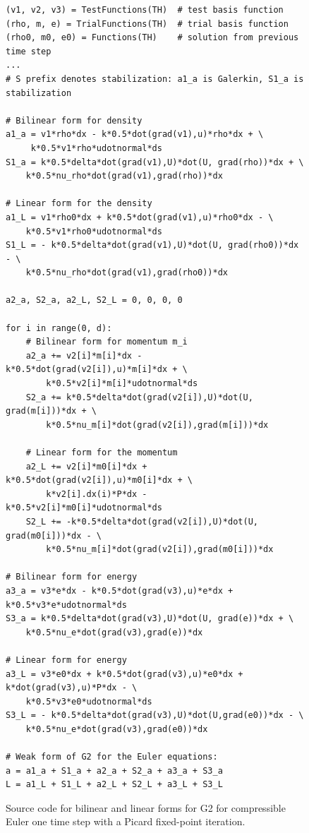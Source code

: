 \begin{figure}[!h]
\begin{lstlisting}
(v1, v2, v3) = TestFunctions(TH)  # test basis function
(rho, m, e) = TrialFunctions(TH)  # trial basis function
(rho0, m0, e0) = Functions(TH)    # solution from previous time step
...
# S prefix denotes stabilization: a1_a is Galerkin, S1_a is stabilization

# Bilinear form for density
a1_a = v1*rho*dx - k*0.5*dot(grad(v1),u)*rho*dx + \
     k*0.5*v1*rho*udotnormal*ds
S1_a = k*0.5*delta*dot(grad(v1),U)*dot(U, grad(rho))*dx + \
    k*0.5*nu_rho*dot(grad(v1),grad(rho))*dx

# Linear form for the density
a1_L = v1*rho0*dx + k*0.5*dot(grad(v1),u)*rho0*dx - \
    k*0.5*v1*rho0*udotnormal*ds
S1_L = - k*0.5*delta*dot(grad(v1),U)*dot(U, grad(rho0))*dx - \
    k*0.5*nu_rho*dot(grad(v1),grad(rho0))*dx

a2_a, S2_a, a2_L, S2_L = 0, 0, 0, 0

for i in range(0, d):
    # Bilinear form for momentum m_i
    a2_a += v2[i]*m[i]*dx - k*0.5*dot(grad(v2[i]),u)*m[i]*dx + \
        k*0.5*v2[i]*m[i]*udotnormal*ds
    S2_a += k*0.5*delta*dot(grad(v2[i]),U)*dot(U, grad(m[i]))*dx + \
        k*0.5*nu_m[i]*dot(grad(v2[i]),grad(m[i]))*dx

    # Linear form for the momentum
    a2_L += v2[i]*m0[i]*dx + k*0.5*dot(grad(v2[i]),u)*m0[i]*dx + \
        k*v2[i].dx(i)*P*dx - k*0.5*v2[i]*m0[i]*udotnormal*ds
    S2_L += -k*0.5*delta*dot(grad(v2[i]),U)*dot(U, grad(m0[i]))*dx - \
        k*0.5*nu_m[i]*dot(grad(v2[i]),grad(m0[i]))*dx

# Bilinear form for energy
a3_a = v3*e*dx - k*0.5*dot(grad(v3),u)*e*dx + k*0.5*v3*e*udotnormal*ds
S3_a = k*0.5*delta*dot(grad(v3),U)*dot(U, grad(e))*dx + \
    k*0.5*nu_e*dot(grad(v3),grad(e))*dx

# Linear form for energy
a3_L = v3*e0*dx + k*0.5*dot(grad(v3),u)*e0*dx + k*dot(grad(v3),u)*P*dx - \
    k*0.5*v3*e0*udotnormal*ds
S3_L = - k*0.5*delta*dot(grad(v3),U)*dot(U,grad(e0))*dx - \
    k*0.5*nu_e*dot(grad(v3),grad(e0))*dx

# Weak form of G2 for the Euler equations:
a = a1_a + S1_a + a2_a + S2_a + a3_a + S3_a
L = a1_L + S1_L + a2_L + S2_L + a3_L + S3_L
\end{lstlisting}
\caption{
Source code for bilinear and linear forms for G2 for compressible Euler one
time step with a Picard fixed-point iteration.  }
\label{code:form_compressible}
\end{figure}


